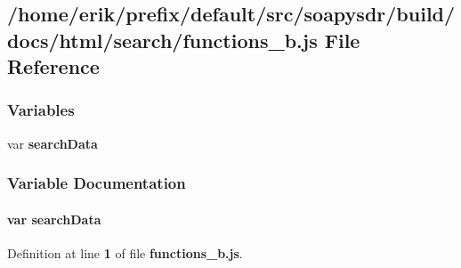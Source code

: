 \subsection{/home/erik/prefix/default/src/soapysdr/build/docs/html/search/functions\+\_\+b.js File Reference}
\label{functions__b_8js}
\subsubsection*{Variables}
\begin{DoxyCompactItemize}
\item 
var {\bf search\+Data}
\end{DoxyCompactItemize}


\subsubsection{Variable Documentation}
\paragraph[{search\+Data}]{\setlength{\rightskip}{0pt plus 5cm}var search\+Data}\label{functions__b_8js_ad01a7523f103d6242ef9b0451861231e}


Definition at line {\bf 1} of file {\bf functions\+\_\+b.\+js}.

